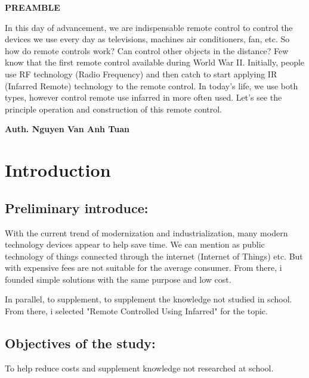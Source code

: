 \documentclass[a4paper]{report}
\begin{document}
    \newpage
    \centerline{\textbf{\huge{PREAMBLE}}} 
    \vspace{10mm}
    \begin{flushleft}
        In this day of advancement, we are indispensable remote control to control
        the devices we use every day as televisions, machines air conditioners, fan, etc.
        So how do remote controls work? Can control other objects in the distance? 
        Few know that the first remote control available during World War II. 
        Initially, people use RF technology (Radio Frequency) and then catch to start applying 
        IR (Infarred Remote) technology to the remote control. In today's life, we use 
        both types, however control remote use infarred in more often used. Let's see the principle operation 
        and construction of this remote control.
    \end{flushleft}
    \begin{flushright}
        \textbf{Auth. Nguyen Van Anh Tuan}
    \end{flushright}
    \thispagestyle{plain} %

    \newpage
    \tableofcontents

    \chapter{Introduction}
    \thispagestyle{fancy}
    \fancyhf{}
    \raggedright %
    \section{Preliminary introduce:} 
        With the current trend of modernization and industrialization, many modern technology 
        devices appear to help save time. We can mention as public technology of things 
        connected through the internet (Internet of Things) etc. But with expensive fees 
        are not suitable for the average consumer. From there, i founded simple solutions 
        with the same purpose and low cost.
        \linebreak
        \par In parallel, to supplement, to supplement the knowledge not studied 
        in school. From there, i selected "Remote Controlled Using Infarred" for the topic.
    \section{Objectives of the study:}
        To help reduce costs and supplement knowledge not researched at school.
\end{document}
